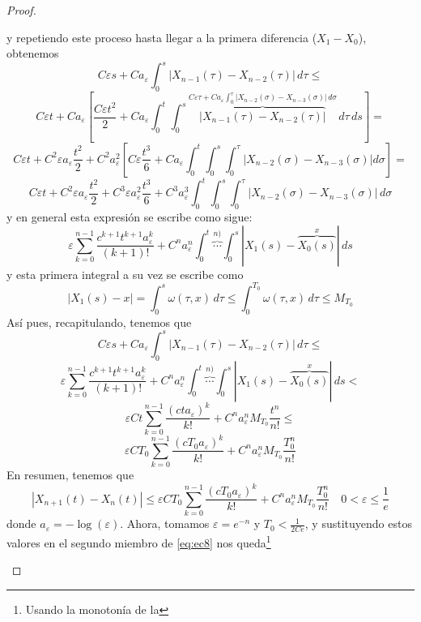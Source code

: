 \begin{proof}
\begin{itemize}
        y repetiendo este proceso hasta llegar a la primera diferencia ($X_1 - X_0$), obtenemos
        $$C \varepsilon s + C a_{\varepsilon} \int_{0}^{s} |X_{n-1}(\tau) - X_{n-2}(\tau)|\,d \tau \leq $$
        $$C \varepsilon t + C a_{\varepsilon} \left[ \dfrac{C \varepsilon t^2}{2} + Ca_{\varepsilon} \int_{0}^{t} \int_{0}^{s} 
        \overbrace{|X_{n-1}(\tau) - X_{n-2}(\tau)|}^{C \varepsilon \tau + C a_\varepsilon \int_{0}^{\tau} |X_{n-2}(\sigma) - X_{n-3}(\sigma)|\,d \sigma}\,d \tau \, ds  \right] =$$
        $$C \varepsilon t + C^2 \varepsilon a_\varepsilon \dfrac{t^2}{2} + C^2 a^2_\varepsilon
        \left[ C \varepsilon \dfrac{t^3}{6} + C a_\varepsilon \int_{0}^{t} \int_{0}^{s} \int_{0}^{\tau} |X_{n-2}(\sigma) - X_{n-3}(\sigma)| d \sigma \right] = $$
        $$C \varepsilon t + C^2 \varepsilon a_\varepsilon \dfrac{t^2}{2} + C^3 \varepsilon a^2_\varepsilon \dfrac{t^3}{6} + C^3 a_\varepsilon^3 \int_{0}^{t} \int_{0}^{s} \int_{0}^{\tau}
        |X_{n-2}(\sigma) - X_{n-3}(\sigma)|\,d \sigma$$
        y en general esta expresión se escribe como sigue:
        $$\varepsilon \sum_{k=0}^{n-1} \dfrac{c^{k+1} t^{k+1} a_\varepsilon^k}{(k+1)!} + C^n a^n_\varepsilon \int_{0}^{t} \overbrace{\cdots}^{n)} \int_{0}^{s} |X_1(s) - \overbrace{X_0(s)}^{x}|\,ds$$
        y esta primera integral a su vez se escribe como
        $$|X_1(s) - x| = \int_{0}^{s} \omega(\tau, x)\,d \tau \leq \int_{0}^{T_0} \omega(\tau, x)\, d \tau \leq M_{T_0}$$
        Así pues, recapitulando, tenemos que 
        $$C \varepsilon s + C a_{\varepsilon} \int_{0}^{s} |X_{n-1}(\tau) - X_{n-2}(\tau)|\,d \tau \leq $$
        $$\varepsilon \sum_{k=0}^{n-1} \dfrac{c^{k+1} t^{k+1} a_\varepsilon^k}{(k+1)!} + C^n a^n_\varepsilon \int_{0}^{t} \overbrace{\cdots}^{n)} \int_{0}^{s} |X_1(s) - \overbrace{X_0(s)}^{x}|\,ds <$$
        $$\varepsilon C t \sum_{k=0}^{n-1} \dfrac{(c t a_\varepsilon)^k}{k!} + C^n a_\varepsilon^n M_{T_0} \dfrac{t^n}{n!} \leq$$
        $$\varepsilon C T_0 \sum_{k=0}^{n-1} \dfrac{(c T_0 a_\varepsilon)^k}{k!} + C^n a_\varepsilon^n M_{T_0} \dfrac{T_0^n}{n!}$$
        En resumen, tenemos que 
        \begin{equation}\label{eq:ec8}
            |X_{n+1}(t) - X_n(t)| \leq \varepsilon C T_0 \sum_{k=0}^{n-1} \dfrac{(c T_0 a_\varepsilon)^k}{k!} + 
            C^n a_\varepsilon^n M_{T_0} \dfrac{T_0^n}{n!} \quad 0 < \varepsilon \leq \dfrac{1}{e}
        \end{equation}
        donde $a_\varepsilon = -\log(\varepsilon)$. Ahora, tomamos $\varepsilon = e^{-n}$ y $T_0 < \frac{1}{2Ce}$, y sustituyendo estos valores en el segundo miembro de \eqref{eq:ec8} nos queda\footnote{Usando la monotonía de la 
}
\end{itemize}
\end{proof}
